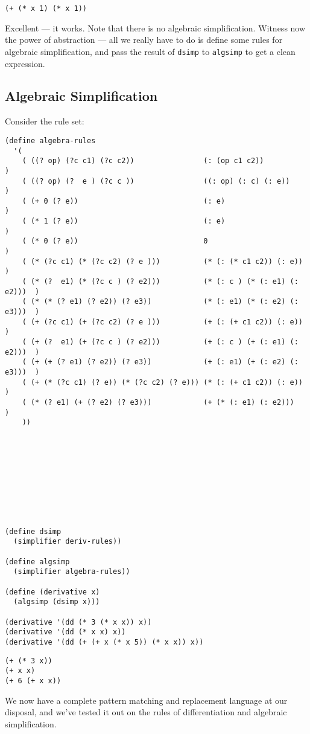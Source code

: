 \documentclass[9pt]{report}
\begin{document}
\begin{verbatim}
(+ (* x 1) (* x 1))
\end{verbatim}


Excellent --- it works. Note that there is no algebraic
simplification. Witness now the power of abstraction --- all we
really have to do is define some rules for algebraic
simplification, and pass the result of \texttt{dsimp} to \texttt{algsimp} to get
a clean expression.

\subsection{Algebraic Simplification}
\label{sec:org105e24e}
Consider the rule set:

\begin{verbatim}
(define algebra-rules
  '(
    ( ((? op) (?c c1) (?c c2))                (: (op c1 c2))                )
    ( ((? op) (?  e ) (?c c ))                ((: op) (: c) (: e))          )
    ( (+ 0 (? e))                             (: e)                         )
    ( (* 1 (? e))                             (: e)                         )
    ( (* 0 (? e))                             0                             )
    ( (* (?c c1) (* (?c c2) (? e )))          (* (: (* c1 c2)) (: e))       )
    ( (* (?  e1) (* (?c c ) (? e2)))          (* (: c ) (* (: e1) (: e2)))  )
    ( (* (* (? e1) (? e2)) (? e3))            (* (: e1) (* (: e2) (: e3)))  )
    ( (+ (?c c1) (+ (?c c2) (? e )))          (+ (: (+ c1 c2)) (: e))       )
    ( (+ (?  e1) (+ (?c c ) (? e2)))          (+ (: c ) (+ (: e1) (: e2)))  )
    ( (+ (+ (? e1) (? e2)) (? e3))            (+ (: e1) (+ (: e2) (: e3)))  )
    ( (+ (* (?c c1) (? e)) (* (?c c2) (? e))) (* (: (+ c1 c2)) (: e))       )
    ( (* (? e1) (+ (? e2) (? e3)))            (+ (* (: e1) (: e2)))         )
    ))
\end{verbatim}

\begin{verbatim}









(define dsimp
  (simplifier deriv-rules))

(define algsimp
  (simplifier algebra-rules))

(define (derivative x)
  (algsimp (dsimp x)))

(derivative '(dd (* 3 (* x x)) x))
(derivative '(dd (* x x) x))
(derivative '(dd (+ (+ x (* x 5)) (* x x)) x))
\end{verbatim}

\begin{verbatim}
(+ (* 3 x))
(+ x x)
(+ 6 (+ x x))
\end{verbatim}


We now have a complete pattern matching and replacement language at
our disposal, and we've tested it out on the rules of
differentiation and algebraic simplification.
\end{document}
